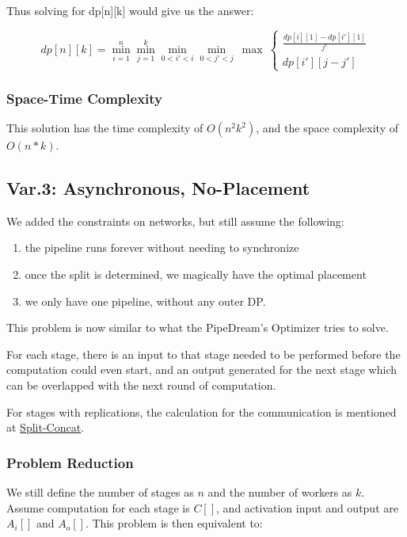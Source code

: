 \documentclass[12pt,letterpaper]{article}
\begin{document}
Thus solving for dp[n][k] would give us the answer:

$$dp[n][k] = \min_{i=1}^n\min_{j=1}^k\min_{0<i'<i}\min_{0<j'<j}\ \max\ \left\{\begin{array}{lr}
        	\frac{dp[i][1] - dp[i'][1]}{j'} \\
        	dp[i'][j-j']
        \end{array} \right .$$

\subsubsection{Space-Time Complexity}
This solution has the time complexity of $O(n^2k^2)$, and the space complexity of $O(n * k)$.

\subsection{Var.3: Asynchronous, No-Placement}
We added the constraints on networks, but still assume the following:
\begin{enumerate}
	\item the pipeline runs forever without needing to synchronize
	\item once the split is determined, we magically have the optimal placement
	\item we only have one pipeline, without any outer DP.
\end{enumerate}

This problem is now similar to what the PipeDream's Optimizer tries to solve.

For each stage, there is an input to that stage needed to be performed before the computation could even start, and an output generated for the next stage which can be overlapped with the next round of computation. 

For stages with replications, the calculation for the communication is mentioned at \hyperref[sec:Split-Concat]{Split-Concat}.

\subsubsection{Problem Reduction}

We still define the number of stages as $n$ and the number of workers as $k$. Assume computation for each stage is $C[]$, and activation input and output are $A_i[]$ and $A_o[]$. This problem is then equivalent to:
\end{document}
